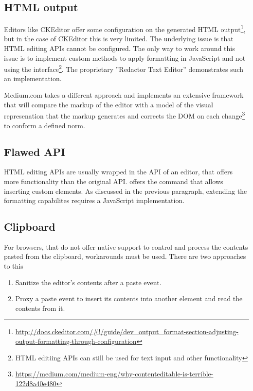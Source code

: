 \subsection{HTML output} 
\label{subsec:treating_issues_first}

Editors like CKEditor offer some configuration on the generated HTML output\footnote{\url{http://docs.ckeditor.com/\#!/guide/dev\_output\_format-section-adjusting-output-formatting-through-configuration}}, but in the case of CKEditor this is very limited. The underlying issue is that HTML editing APIs cannot be configured. The only way to work around this issue is to implement custom methods to apply formatting in JavaScript and not using the  interface\footnote{HTML editiing APIs can still be used for text input and other functionality}. The proprietary ''Redactor Text Editor'' demonstrates such an implementation.

Medium.com takes a different approach and implements an extensive framework that will compare the markup of the editor with a model of the visual represenation that the markup generates and corrects the DOM on each change\footnote{\url{https://medium.com/medium-eng/why-contenteditable-is-terrible-122d8a40e480}} to conform a defined norm.

\subsection{Flawed API}

HTML editing APIs are usually wrapped in the API of an editor, that offers more functionality than the original API.  offers the  command that allows inserting custom elements. As discussed in the previous paragraph, extending the formatting capabilites requires a JavaScript implementation.

\subsection{Clipboard}

For browsers, that do not offer native support to control and process the contents pasted from the clipboard, workarounds must be used. There are two approaches to this

\begin{enumerate}
\item Sanitize the editor's contents after a paste event.
\item Proxy a paste event to insert its contents into another element and read the contents from it.
\end{enumerate}

